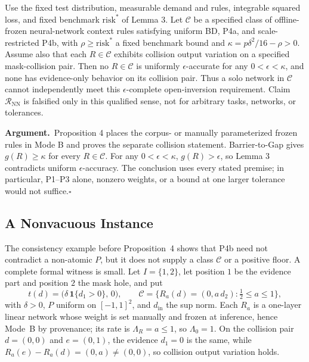 \documentclass[twoside,11pt]{article}
\newcommand{\argument}{\par\medskip\noindent\textbf{Argument.}\ }
\newcommand{\qedbox}{\hfill$\square$}
\begin{document}
\begin{theorem}
Use the fixed test distribution, measurable demand and rules, integrable squared loss, and fixed benchmark $\mathrm{risk}^*$ of Lemma 3. Let $\mathcal{C}$ be a specified class of offline-frozen neural-network context rules satisfying uniform BD, P4a, and scale-restricted P4b, with $\rho\ge\mathrm{risk}^*$ a fixed benchmark bound and $\kappa=p\delta^2/16-\rho>0$. Assume also that each $R\in\mathcal{C}$ exhibits collision output variation on a specified mask-collision pair. Then no $R\in\mathcal{C}$ is uniformly $\epsilon$-accurate for any $0<\epsilon<\kappa$, and none has evidence-only behavior on its collision pair. Thus a solo network in $\mathcal{C}$ cannot independently meet this $\epsilon$-complete open-inversion requirement. Claim $\mathcal{R}_{\mathrm{NN}}$ is falsified only in this qualified sense, not for arbitrary tasks, networks, or tolerances.
\end{theorem}

\argument Proposition 4 places the corpus- or manually parameterized frozen rules in Mode B and proves the separate collision statement. Barrier-to-Gap gives $g(R)\geq\kappa$ for every $R\in\mathcal{C}$. For any $0<\epsilon<\kappa$, $g(R)>\epsilon$, so Lemma 3 contradicts uniform $\epsilon$-accuracy. The conclusion uses every stated premise; in particular, P1--P3 alone, nonzero weights, or a bound at one larger tolerance would not suffice.\qedbox


\subsection{A Nonvacuous Instance}
\label{sec:instance}%

The consistency example before Proposition~4 shows that P4b need not contradict a non-atomic $P$, but it does not supply a class $\mathcal{C}$ or a positive floor. A complete formal witness is small. Let $I=\{1,2\}$, let position $1$ be the evidence part and position $2$ the mask hole, and put
\begin{equation}
t(d)=\bigl(\delta\,\mathbf{1}\{d_1>0\},\,0\bigr),
\qquad
\mathcal{C}=\bigl\{R_a(d)=(0,a\,d_2): \tfrac12\le a\le 1\bigr\},
\label{eq:witness}%
\end{equation}
with $\delta>0$, $P$ uniform on $[-1,1]^2$, and $d_{\mathrm{in}}$ the sup norm. Each $R_a$ is a one-layer linear network whose weight is set manually and frozen at inference, hence Mode~B by provenance; its rate is $\Lambda_R=a\le 1$, so $\Lambda_0=1$. On the collision pair $d=(0,0)$ and $e=(0,1)$, the evidence $d_1=0$ is the same, while $R_a(e)-R_a(d)=(0,a)\neq(0,0)$, so collision output variation holds.
\end{document}
